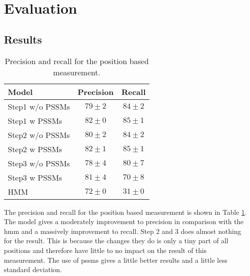 \section{Evaluation}

\subsection{Results}


\begin{table}
	\centering 
	\begin{tabular}{l|c|c}
		Model & Precision & Recall \\ \hline
		Step1 w/o PSSMs & $79 \pm 2$ & $84 \pm 2$ \\
		Step1 w PSSMs   & $82 \pm 0$ & $85 \pm 1$ \\
		Step2 w/o PSSMs & $80 \pm 2$ & $84 \pm 2$ \\
		Step2 w PSSMs   & $82 \pm 1$ & $85 \pm 1$ \\
		Step3 w/o PSSMs & $78 \pm 4$ & $80 \pm 7$ \\
		Step3 w PSSMs   & $81 \pm 4$ & $70 \pm 8$ \\
		HMM & $72 \pm 0$ & $31 \pm 0$ \\
	\end{tabular}
	\caption{Precision and recall for the position based measurement.}
	\label{tab:char}
\end{table}

The precision and recall for the position based measurement is shown in 
Table \ref{tab:char}. The model gives a moderately improvement to precision
in comparison with the \gls{hmm} and a massively improvement to recall.
Step 2 and 3 does almost nothing for the result. This is because the changes
they do is only a tiny part of all positions and therefore have little to 
no impact on the result of this measurement. The use of \glspl{pssm} 
gives a little better results and a little less standard deviation. 

